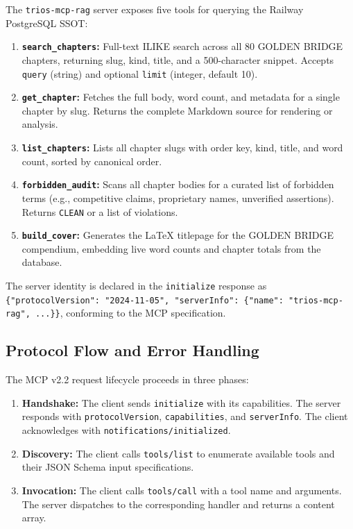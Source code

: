 The \texttt{trios-mcp-rag} server exposes five tools for querying the Railway PostgreSQL SSOT:

\begin{enumerate}
\item \textbf{\texttt{search\_chapters}:} Full-text ILIKE search across all 80 GOLDEN BRIDGE chapters, returning slug, kind, title, and a 500-character snippet. Accepts \texttt{query} (string) and optional \texttt{limit} (integer, default 10).

\item \textbf{\texttt{get\_chapter}:} Fetches the full body, word count, and metadata for a single chapter by slug. Returns the complete Markdown source for rendering or analysis.

\item \textbf{\texttt{list\_chapters}:} Lists all chapter slugs with order key, kind, title, and word count, sorted by canonical order.

\item \textbf{\texttt{forbidden\_audit}:} Scans all chapter bodies for a curated list of forbidden terms (e.g., competitive claims, proprietary names, unverified assertions). Returns \texttt{CLEAN} or a list of violations.

\item \textbf{\texttt{build\_cover}:} Generates the LaTeX titlepage for the GOLDEN BRIDGE compendium, embedding live word counts and chapter totals from the database.
\end{enumerate}

The server identity is declared in the \texttt{initialize} response as \texttt{\{"protocolVersion": "2024-11-05", "serverInfo": \{"name": "trios-mcp-rag", ...\}\}}, conforming to the MCP specification.

\subsection{Protocol Flow and Error Handling}\label{fa_23:subsec:protocol-flow}

The MCP v2.2 request lifecycle proceeds in three phases:

\begin{enumerate}
\item \textbf{Handshake:} The client sends \texttt{initialize} with its capabilities. The server responds with \texttt{protocolVersion}, \texttt{capabilities}, and \texttt{serverInfo}. The client acknowledges with \texttt{notifications/initialized}.

\item \textbf{Discovery:} The client calls \texttt{tools/list} to enumerate available tools and their JSON Schema input specifications.

\item \textbf{Invocation:} The client calls \texttt{tools/call} with a tool name and arguments. The server dispatches to the corresponding handler and returns a content array.
\end{enumerate}

